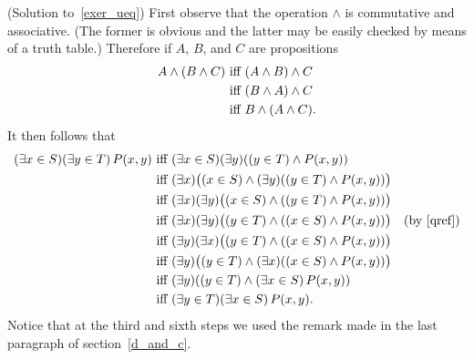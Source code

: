 \begin{prf}\label{sol_exer_ueq}(Solution to~\ref{exer_ueq})
First observe that the operation $\land$ is commutative and associative. (The former is
obvious and the latter may be easily checked by means of a truth table.)  Therefore if $A$,
$B$, and $C$ are propositions
\begin{align}\label{qref}
    A \land (B \land C) &\text{ iff }(A \land B)\land C \notag\\
                        &\text{ iff }  (B \land A) \land C \\
                        &\text{ iff }   B \land (A \land C). \notag
\end{align}
It then follows that
\begin{align*}
     (\exists x \in S)(\exists y \in T)\,P(x, y)
        &\text{ iff } (\exists x \in S)
            (\exists y) ((y \in T) \land P(x,y)) \\
        &\text{ iff } (\exists x)\bigl((x \in S) \land
            (\exists y) ((y \in T) \land P(x,y))\bigr) \\
        &\text{ iff } (\exists x)(\exists y)\bigl((x \in S)
             \land ((y \in T) \land P(x,y))\bigr) \\
        &\text{ iff } (\exists x)(\exists y)\bigl((y \in T)
             \land ((x \in S) \land P(x,y))\bigr)\quad
             \text{(by \eqref{qref})}\\
        &\text{ iff } (\exists y)(\exists x)\bigl((y \in T)
             \land ((x \in S) \land P(x,y))\bigr) \\
        &\text{ iff } (\exists y)\bigl((y \in T)
             \land (\exists x)((x \in S) \land P(x,y))\bigr) \\
        &\text{ iff } (\exists y)((y \in T)
             \land (\exists x \in S)\,P(x,y)) \\
        &\text{ iff } (\exists y \in T)(\exists x \in S)\,P(x,y) .
\end{align*}
Notice that at the third and sixth steps we used the remark made in the last paragraph of
section~\ref{d_and_c}.
\end{prf}

